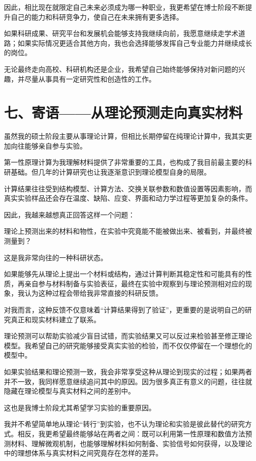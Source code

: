 因此，相比现在就限定自己未来必须成为哪一种职业，我更希望在博士阶段不断提升自己的能力和科研竞争力，使自己在未来拥有更多选择。

如果科研成果、研究平台和发展机会能够支持我继续向前，我愿意继续走学术道路；如果实际情况更适合其他方向，我也会选择能够发挥自己专业能力并继续成长的岗位。

无论最终走向高校、科研机构还是企业，我希望自己始终能够保持对新问题的兴趣，并尽量从事具有一定研究性和创造性的工作。

\section{七、寄语——从理论预测走向真实材料}

虽然我的硕士阶段主要从事理论计算，但相比长期停留在纯理论计算中，我其实更加向往能够亲自参与实验。

第一性原理计算为我理解材料提供了非常重要的工具，也构成了我目前最主要的科研基础。但几年的计算研究也让我逐渐意识到理论模型自身的局限。

计算结果往往受到结构模型、计算方法、交换关联参数和数值设置等因素影响，而真实实验样品还会存在温度、缺陷、应变、界面和动力学过程等更加复杂的条件。

因此，我越来越想真正回答这样一个问题：

理论上预测出来的材料和物性，在实验中究竟能不能被做出来、被看到，并最终被测量到？

这是我非常向往的一种科研状态。

如果能够先从理论上提出一个材料或结构，通过计算判断其稳定性和可能具有的性质，再亲自参与材料制备与实验表征，最终在实验中观察到与理论预测相对应的现象，我认为这种过程会带给我非常直接的科研反馈。

对我而言，这种反馈不仅意味着“计算结果得到了验证”，更重要的是说明自己的研究真正和现实材料建立了联系。

理论预测可以帮助实验减少盲目试错，而实验结果又可以反过来检验甚至修正理论模型。我希望自己的研究能够接受真实实验的检验，而不仅仅停留在一个理想化的模型中。

如果实验结果和理论预测一致，我会非常享受这种从理论到现实的过程；如果两者并不一致，我同样愿意继续追问其中的原因。因为很多真正有意义的问题，往往就隐藏在理论模型与真实材料之间的差别中。

这也是我博士阶段尤其希望学习实验的重要原因。

我并不希望简单地从理论“转行”到实验，也不认为理论和实验是彼此替代的研究方式。相反，我更希望最终能够站在两者之间：既可以利用第一性原理和数值方法预测材料、理解微观机制，也能够理解材料如何制备、实验信号如何获得，以及理论中的理想体系与真实材料之间究竟存在怎样的差异。


